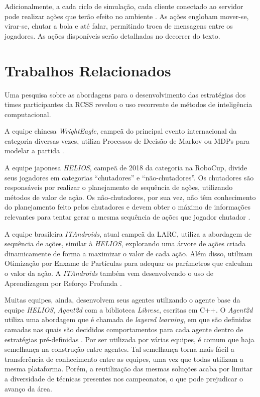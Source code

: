 Adicionalmente, a cada ciclo de simulação, cada cliente conectado ao servidor pode realizar ações que terão efeito no ambiente \cite{rcssmanual2003}. As ações englobam mover-se, virar-se, chutar a bola e até falar, permitindo troca de mensagens entre os jogadores. As ações disponíveis serão detalhadas no decorrer do texto.


\section{Trabalhos Relacionados}
\label{subsec:abordagens}

Uma pesquisa sobre as abordagens para o desenvolvimento das estratégias dos times participantes da RCSS revelou o uso recorrente de métodos de inteligência computacional.

A equipe chinesa \textit{WrightEagle}, campeã do principal evento internacional da categoria diversas vezes, utiliza Processos de Decisão de Markov ou MDPs para modelar a partida \cite{bai2015online}.

A equipe japonesa \textit{HELIOS}, campeã de 2018 da categoria na RoboCup, divide seus jogadores em categorias ``chutadores'' e ``não-chutadores''.
Os chutadores são responsáveis por realizar o planejamento de sequência de ações, utilizando métodos de valor de ação.
Os não-chutadores, por sua vez, não têm conhecimento do planejamento feito pelos chutadores e devem obter o máximo de informações relevantes para tentar gerar a mesma sequência de ações que jogador chutador \cite{nakashima2018helios2018}.

A equipe brasileira \textit{ITAndroids}, atual campeã da LARC, utiliza a abordagem de sequência de ações, similar à \textit{HELIOS}, explorando uma árvore de ações criada dinamicamente de forma a maximizar o valor de cada ação. Além disso, utilizam Otimização por Enxame de Partículas \cite{melloitandroids} para adequar os parâmetros que calculam o valor da ação. A \textit{ITAndroids} também vem desenvolvendo o uso de Aprendizagem por Reforço Profunda \cite{maximoitandroids}.

Muitas equipes, ainda, desenvolvem seus agentes utilizando o agente base da equipe \textit{HELIOS}, \textit{Agent2d} com a biblioteca \textit{Librcsc}, escritas em C++. O \textit{Agent2d} utiliza uma abordagem que é chamada de \textit{layered learning}, em que são definidas camadas nas quais são decididos comportamentos para cada agente dentro de estratégias pré-definidas \cite{nakashima2018helios2018}. Por ser utilizada por várias equipes, é comum que haja semelhança na construção entre agentes. Tal semelhança torna mais fácil a transferência de conhecimento entre as equipes, uma vez que todas utilizam a mesma plataforma. Porém, a reutilização das mesmas soluções acaba por limitar a diversidade de técnicas presentes nos campeonatos, o que pode prejudicar o avanço da área.

